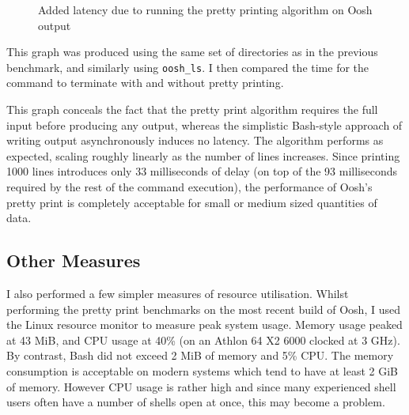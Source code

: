 \documentclass[12pt,twoside,notitlepage]{report}
\begin{document}
\begin{figure}[h]
  \centering
  \setlength\fboxsep{0.5pt}
  \setlength\fboxrule{0.5pt}
  \caption{Added latency due to running the pretty printing algorithm on
    Oosh output}
\end{figure}

This graph was produced using the same set of directories as in the
previous benchmark, and similarly using {\tt oosh\_ls}. I then
compared the time for the command to terminate with and without pretty
printing.

This graph conceals the fact that the pretty print algorithm requires
the full input before producing any output, whereas the simplistic
Bash-style approach of writing output asynchronously induces no
latency. The algorithm performs as expected, scaling roughly linearly
as the number of lines increases. Since printing 1000 lines introduces
only 33 milliseconds of delay (on top of the 93 milliseconds required
by the rest of the command execution), the performance of Oosh's
pretty print is completely acceptable for small or medium sized
quantities of data.

\subsection{Other Measures}
\label{othermeasures}

I also performed a few simpler measures of resource
utilisation. Whilst performing the pretty print benchmarks on the most
recent build of Oosh, I used the Linux resource monitor to measure
peak system usage. Memory usage peaked at 43 MiB, and CPU usage at 40\%
(on an Athlon 64 X2 6000 clocked at 3 GHz). By contrast, Bash did not
exceed 2 MiB of memory and 5\% CPU. The memory consumption is
acceptable on modern systems which tend to have at least 2 GiB of
memory. However CPU usage is rather high and since many experienced
shell users often have a number of shells open at once, this may
become a problem.
\end{document}
